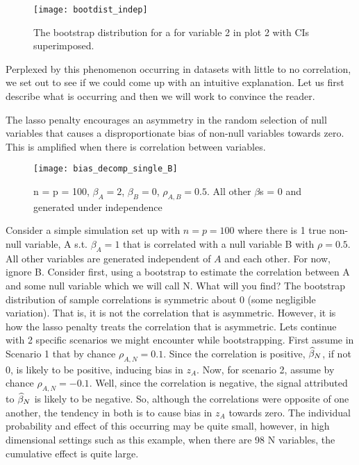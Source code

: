 \begin{figure}[hbtp]
    \begin{center}
    \texttt{[image: bootdist\_indep]}
    \caption{\label{Fig:bootdist_indep} The bootstrap distribution for a for variable 2 in plot 2 with CIs superimposed. }
    \end{center}
\end{figure}

Perplexed by this phenomenon occurring in datasets with little to no correlation, we set out to see if we could come up with an intuitive explanation. Let us first describe what is occurring and then we will work to convince the reader. 

The lasso penalty encourages an asymmetry in the random selection of null variables that causes a disproportionate bias of non-null variables towards zero. This is amplified when there is correlation between variables.

\begin{figure}[hbtp]
    \begin{center}
    \texttt{[image: bias\_decomp\_single\_B]}
    \caption{\label{Fig:bias_decomp_single_B} n = p = 100, $\beta_A = 2$, $\beta_B = 0$, $\rho_{A,B} = 0.5$.  All other $\beta$s = 0 and  generated under independence}
    \end{center}
\end{figure}


Consider a simple simulation set up with $n = p = 100$ where there is 1 true non-null variable, A s.t. $\beta_A = 1$ that is correlated with a null variable B with $\rho = 0.5$. All other variables are generated independent of $A$ and each other. For now, ignore B. Consider first, using a bootstrap to estimate the correlation between A and some null variable which we will call N. What will you find? The bootstrap distribution of sample correlations is symmetric about 0 (some negligible variation). That is, it is not the correlation that is asymmetric. However, it is how the lasso penalty treats the correlation that is asymmetric. Lets continue with 2 specific scenarios we might encounter while bootstrapping. First assume in Scenario 1 that by chance $\rho_{A,N} = 0.1$. Since the correlation is positive, $\widehat{\beta}_N$, if not 0, is likely to be positive, inducing bias in $z_A$. Now, for scenario 2, assume by chance $\rho_{A,N} = -0.1$. Well, since the correlation is negative, the signal attributed to $\widehat{\beta}_N$ is likely to be negative. So, although the correlations were opposite of one another, the tendency in both is to cause bias in $z_A$ towards zero. The individual probability and effect of this occurring may be quite small, however, in high dimensional settings such as this example, when there are 98 N variables, the cumulative effect is quite large. 

